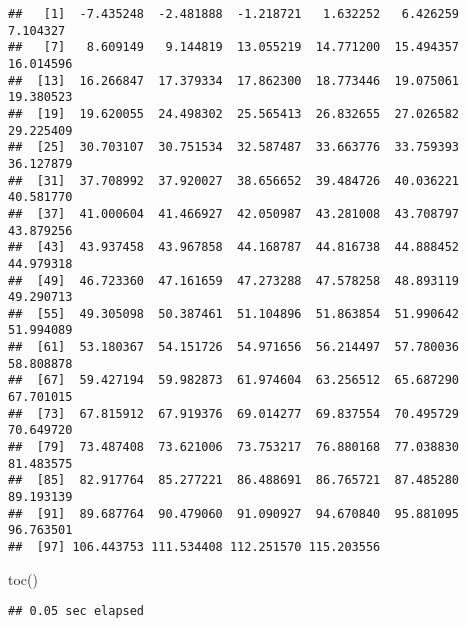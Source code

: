 \documentclass[]{elsarticle} %
\newenvironment{Shaded}{\begin{snugshade}}{\end{snugshade}}
\newcommand{\FunctionTok}[1]{\textcolor[rgb]{0.00,0.00,0.00}{#1}}
\newcommand{\NormalTok}[1]{#1}
\begin{document}
\begin{verbatim}
##   [1]  -7.435248  -2.481888  -1.218721   1.632252   6.426259   7.104327
##   [7]   8.609149   9.144819  13.055219  14.771200  15.494357  16.014596
##  [13]  16.266847  17.379334  17.862300  18.773446  19.075061  19.380523
##  [19]  19.620055  24.498302  25.565413  26.832655  27.026582  29.225409
##  [25]  30.703107  30.751534  32.587487  33.663776  33.759393  36.127879
##  [31]  37.708992  37.920027  38.656652  39.484726  40.036221  40.581770
##  [37]  41.000604  41.466927  42.050987  43.281008  43.708797  43.879256
##  [43]  43.937458  43.967858  44.168787  44.816738  44.888452  44.979318
##  [49]  46.723360  47.161659  47.273288  47.578258  48.893119  49.290713
##  [55]  49.305098  50.387461  51.104896  51.863854  51.990642  51.994089
##  [61]  53.180367  54.151726  54.971656  56.214497  57.780036  58.808878
##  [67]  59.427194  59.982873  61.974604  63.256512  65.687290  67.701015
##  [73]  67.815912  67.919376  69.014277  69.837554  70.495729  70.649720
##  [79]  73.487408  73.621006  73.753217  76.880168  77.038830  81.483575
##  [85]  82.917764  85.277221  86.488691  86.765721  87.485280  89.193139
##  [91]  89.687764  90.479060  91.090927  94.670840  95.881095  96.763501
##  [97] 106.443753 111.534408 112.251570 115.203556
\end{verbatim}

\begin{Shaded}
\begin{Highlighting}[]
\FunctionTok{toc}\NormalTok{()}
\end{Highlighting}
\end{Shaded}

\begin{verbatim}
## 0.05 sec elapsed
\end{verbatim}
\end{document}
